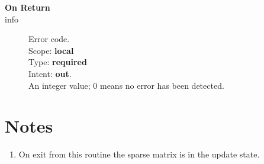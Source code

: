 \begin{description}
\item[\bf On Return]
\item[info] Error code.\\
Scope: {\bf local} \\
Type: {\bf required} \\
Intent: {\bf out}.\\
An integer value; 0 means no error has been detected. 
\end{description}
\section*{Notes}
\begin{enumerate}
\item On exit from this routine the sparse matrix is in the update
  state. 
\end{enumerate}
%
%





